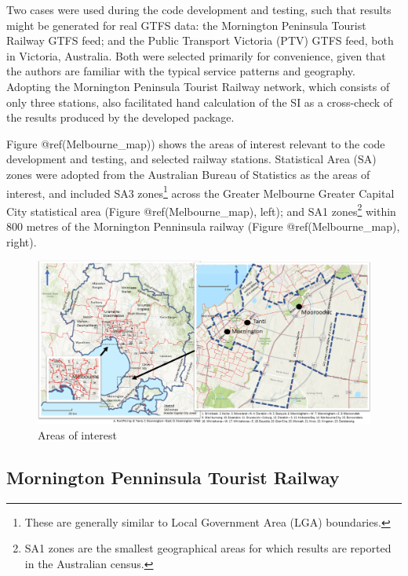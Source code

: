 \documentclass[preprint, 3p,
authoryear]{elsarticle} %
\begin{document}
Two cases were used during the code development and testing, such that
results might be generated for real GTFS data: the Mornington Peninsula
Tourist Railway GTFS feed; and the Public Transport Victoria (PTV) GTFS
feed, both in Victoria, Australia. Both were selected primarily for
convenience, given that the authors are familiar with the typical
service patterns and geography. Adopting the Mornington Peninsula
Tourist Railway network, which consists of only three stations, also
facilitated hand calculation of the SI as a cross-check of the results
produced by the developed package.

Figure @ref(Melbourne\_map)) shows the areas of interest relevant to the
code development and testing, and selected railway stations. Statistical
Area (SA) zones were adopted from the Australian Bureau of Statistics
\citep{ABSmaps} as the areas of interest, and included SA3
zones\footnote{These are generally similar to Local Government Area
  (LGA) boundaries.} across the Greater Melbourne Greater Capital City
statistical area (Figure @ref(Melbourne\_map), left); and SA1
zones\footnote{SA1 zones are the smallest geographical areas for which
  results are reported in the Australian census.} within 800 metres of
the Mornington Penninsula railway (Figure @ref(Melbourne\_map), right).

\begin{figure}
\includegraphics[width=1\linewidth]{graphics/all_maps} \caption{Areas of interest}\label{fig:Melbourne_map}
\end{figure}

\hypertarget{mornington-penninsula-tourist-railway}{%
\subsection{Mornington Penninsula Tourist
Railway}\label{mornington-penninsula-tourist-railway}}
\end{document}
